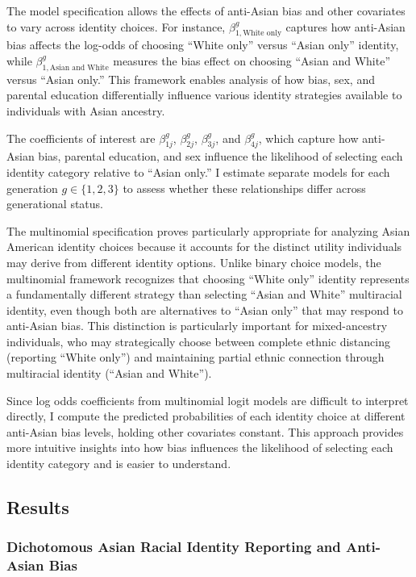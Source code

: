 The model specification allows the effects of anti-Asian bias and other covariates to vary across identity choices. For instance, $\beta_{1,\text{White only}}^g$ captures how anti-Asian bias affects the log-odds of choosing ``White only'' versus ``Asian only'' identity, while $\beta_{1,\text{Asian and White}}^g$ measures the bias effect on choosing ``Asian and White'' versus ``Asian only.'' This framework enables analysis of how bias, sex, and parental education differentially influence various identity strategies available to individuals with Asian ancestry.

The coefficients of interest are $\beta_{1j}^g$, $\beta_{2j}^g$, $\beta_{3j}^g$, and $\beta_{4j}^g$, which capture how anti-Asian bias, parental education, and sex influence the likelihood of selecting each identity category relative to ``Asian only.'' I estimate separate models for each generation $g \in \{1,2,3\}$ to assess whether these relationships differ across generational status.

The multinomial specification proves particularly appropriate for analyzing Asian American identity choices because it accounts for the distinct utility individuals may derive from different identity options. Unlike binary choice models, the multinomial framework recognizes that choosing ``White only'' identity represents a fundamentally different strategy than selecting ``Asian and White'' multiracial identity, even though both are alternatives to ``Asian only'' that may respond to anti-Asian bias. This distinction is particularly important for mixed-ancestry individuals, who may strategically choose between complete ethnic distancing (reporting ``White only'') and maintaining partial ethnic connection through multiracial identity (``Asian and White'').

Since log odds coefficients from multinomial logit models are difficult to interpret directly, I compute the predicted probabilities of each identity choice at different anti-Asian bias levels, holding other covariates constant. This approach provides more intuitive insights into how bias influences the likelihood of selecting each identity category and is easier to understand.

\subsection{Results}\label{sec:results}

\subsubsection{Dichotomous Asian Racial Identity Reporting and Anti-Asian Bias}\label{sec:results-dichotomous}

